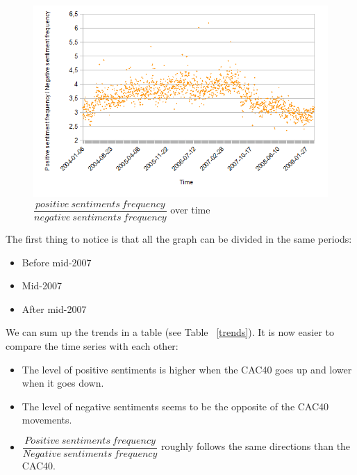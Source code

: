 \documentclass[12pt]{report}
\begin{document}
			\begin{figure}[h!]
				\caption{$\dfrac{positive\ sentiments\ frequency}{negative\ sentiments\ frequency}$ over time\label{posdivneg}}
				\includegraphics{plots/time/posdivneg.png}
			\end{figure}

			The first thing to notice is that all the graph can be divided in the same periods:
			\begin{itemize}
				\item Before mid-2007
				\item Mid-2007
				\item After mid-2007
			\end{itemize}

			 We can sum up the trends in a table (see Table ~\ref{trends}). It is now easier to compare the time series with each other:
			 \begin{itemize}
			 	\item The level of positive sentiments is higher when the CAC40 goes up and lower when it goes down.
			 	\item The level of negative sentiments seems to be the opposite of the CAC40 movements.
			 	\item $\dfrac{Positive\ sentiments\ frequency}{Negative\ sentiments\ frequency}$ roughly follows the same directions than the CAC40.
			 \end{itemize}
\end{document}
